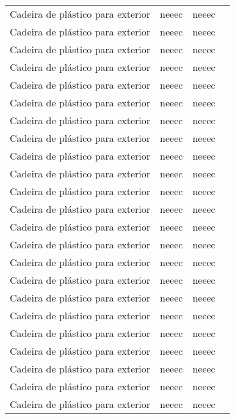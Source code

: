 \begin{longtable}{Xlll}
Cadeira de plástico para exterior & \acrshort{neeec} & \acrshort{neeec} & \\
Cadeira de plástico para exterior & \acrshort{neeec} & \acrshort{neeec} & \\
Cadeira de plástico para exterior & \acrshort{neeec} & \acrshort{neeec} & \\
Cadeira de plástico para exterior & \acrshort{neeec} & \acrshort{neeec} & \\
Cadeira de plástico para exterior & \acrshort{neeec} & \acrshort{neeec} & \\
Cadeira de plástico para exterior & \acrshort{neeec} & \acrshort{neeec} & \\
Cadeira de plástico para exterior & \acrshort{neeec} & \acrshort{neeec} & \\
Cadeira de plástico para exterior & \acrshort{neeec} & \acrshort{neeec} & \\
Cadeira de plástico para exterior & \acrshort{neeec} & \acrshort{neeec} & \\
Cadeira de plástico para exterior & \acrshort{neeec} & \acrshort{neeec} & \\
Cadeira de plástico para exterior & \acrshort{neeec} & \acrshort{neeec} & \\
Cadeira de plástico para exterior & \acrshort{neeec} & \acrshort{neeec} & \\
Cadeira de plástico para exterior & \acrshort{neeec} & \acrshort{neeec} & \\
Cadeira de plástico para exterior & \acrshort{neeec} & \acrshort{neeec} & \\
Cadeira de plástico para exterior & \acrshort{neeec} & \acrshort{neeec} & \\
Cadeira de plástico para exterior & \acrshort{neeec} & \acrshort{neeec} & \\
Cadeira de plástico para exterior & \acrshort{neeec} & \acrshort{neeec} & \\
Cadeira de plástico para exterior & \acrshort{neeec} & \acrshort{neeec} & \\
Cadeira de plástico para exterior & \acrshort{neeec} & \acrshort{neeec} & \\
Cadeira de plástico para exterior & \acrshort{neeec} & \acrshort{neeec} & \\
Cadeira de plástico para exterior & \acrshort{neeec} & \acrshort{neeec} & \\
Cadeira de plástico para exterior & \acrshort{neeec} & \acrshort{neeec} & \\
Cadeira de plástico para exterior & \acrshort{neeec} & \acrshort{neeec} & \\

\end{longtable}
